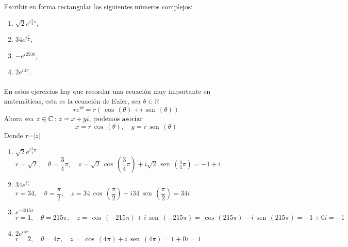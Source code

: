 \documentclass[twoside]{book}
\renewcommand{\sin}{\,\operatorname{sen}\,}
\renewcommand{\cos}{\,\operatorname{cos}\,}
\begin{document}
\begin{example}{}
    Escribir en forma rectangular los siguientes n\'umeros complejos:
    \begin{multicols}{4}
        \begin{enumerate}[label=\alph*).]
            \item $\sqrt{2}e^{i\frac{3}{4}\pi}$,
            \item $34e^{i\frac{\pi}{2}}$,
            \item $-e^{i250\pi}$,
            \item $2e^{i4\pi}$.
        \end{enumerate}
    \end{multicols}

\end{example}
\begin{sol}
    \begin{solucion}{}
        $\phantom{a}$\\
        En estos ejercicios hay que recordar una ecuaci\'on muy importante en matem\'aticas, esta es la ecuaci\'on de Euler, sea $\theta\in\mathbb{R}$
        \begin{equation}\label{formula_euler}
            re^{i\theta}=r\left(\cos(\theta)+i\sin(\theta)\right)
        \end{equation}
        Ahora sea $z\in\mathbb{C}:z=x+yi,\text{\;podemos asociar}$
        $$x=r\cos(\theta) ,\quad y=r\sin(\theta)$$
        Donde r=$|z|$
        \begin{enumerate}
            [label=\textsl{(\alph*)}] %
            \item $\sqrt{2}e^{i\frac{3}{4}\pi}$\\
                  $r=\sqrt{2},\quad \theta=\dfrac{3}{4}\pi, \quad z=\sqrt{2}\cos\left(\dfrac{3}{4}\pi\right)+i\sqrt{2}\sin\left(\frac{3}{4}\pi\right)=\boxed{-1+i}$
            \item $34e^{i\frac{\pi}{2}}$\\
                  $r=34,\quad \theta=\dfrac{\pi}{2},\quad z=34\cos\left(\dfrac{\pi}{2}\right)+i34\sin\left(\dfrac{\pi}{2}\right)=\boxed{34i}$
            \item $e^{-i215\pi}$\\
                  $r=1,\quad\theta=215\pi,\quad z=\cos(-215\pi)+i\sin(-215\pi)=\cos(215\pi)-i\sin(215\pi)=-1+0i=\boxed{-1}$
            \item $2e^{i4\pi}$\\
                  $r=2,\quad \theta=4\pi,\quad z=\cos(4\pi)+i\sin(4\pi)=1+0i=\boxed{1}$
        \end{enumerate}

    \end{solucion}
\end{sol}
\end{document}
